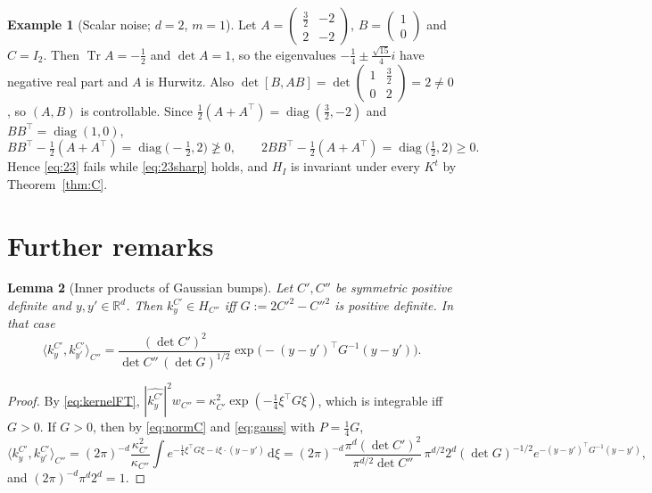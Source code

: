 \documentclass[11pt]{article}
\newtheorem{lemma}{Lemma}
\theoremstyle{definition}
\newtheorem{example}[lemma]{Example}
\theoremstyle{remark}
\newcommand{\R}{\mathbb{R}}
\newcommand{\Tr}{\operatorname{Tr}}
\newcommand{\dd}{\,\mathrm{d}}
\newcommand{\ip}[2]{\langle #1,#2\rangle}
\newcommand{\hatf}[1]{\widehat{#1}}
\newcommand{\tp}{\top}
\begin{document}
\begin{example}[Scalar noise; $d=2$, $m=1$]\label{ex:scalar}
Let $A=\begin{pmatrix}\frac32&-2\\2&-2\end{pmatrix}$, $B=\begin{pmatrix}1\\0\end{pmatrix}$ and $C=I_2$. Then $\Tr A=-\frac12$ and $\det A=1$, so
the eigenvalues $-\frac14\pm\frac{\sqrt{15}}4i$ have negative real part and $A$ is Hurwitz. Also
$\det[B,AB]=\det\begin{pmatrix}1&\frac32\\0&2\end{pmatrix}=2\neq0$, so $(A,B)$ is controllable. Since
$\frac12(A+A^\tp)=\operatorname{diag}(\frac32,-2)$ and $BB^\tp=\operatorname{diag}(1,0)$,
\[
BB^\tp-\tfrac12(A+A^\tp)=\operatorname{diag}\bigl(-\tfrac12,2\bigr)\not\ge0,\qquad
2BB^\tp-\tfrac12(A+A^\tp)=\operatorname{diag}\bigl(\tfrac12,2\bigr)\ge0 .
\]
Hence \eqref{eq:23} fails while \eqref{eq:23sharp} holds, and $H_I$ is invariant under every $K^t$ by Theorem~\ref{thm:C}.
\end{example}

\section{Further remarks}\label{sec:remarks}

\begin{lemma}[Inner products of Gaussian bumps]\label{lem:bumps}
Let $C',C''$ be symmetric positive definite and $y,y'\in\R^d$. Then $k^{C'}_y\in H_{C''}$ iff $G:=2C'^2-C''^2$ is
positive definite. In that case
\[
\ip{k^{C'}_y}{k^{C'}_{y'}}_{C''}=\frac{(\det C')^2}{\det C''\,(\det G)^{1/2}}\exp\bigl(-(y-y')^\tp G^{-1}(y-y')\bigr).
\]
\end{lemma}

\begin{proof}
By \eqref{eq:kernelFT}, $|\hatf{k^{C'}_y}|^2w_{C''}=\kappa_{C'}^2\exp(-\frac14\xi^\tp G\xi)$, which is integrable iff
$G>0$. If $G>0$, then by \eqref{eq:normC} and \eqref{eq:gauss} with $P=\frac14G$,
\[
\ip{k^{C'}_y}{k^{C'}_{y'}}_{C''}=(2\pi)^{-d}\frac{\kappa_{C'}^2}{\kappa_{C''}}\int e^{-\frac14\xi^\tp G\xi-i\xi\cdot(y-y')}\dd\xi
=(2\pi)^{-d}\frac{\pi^d(\det C')^2}{\pi^{d/2}\det C''}\,\pi^{d/2}2^d(\det G)^{-1/2}e^{-(y-y')^\tp G^{-1}(y-y')},
\]
and $(2\pi)^{-d}\pi^d2^d=1$.
\end{proof}
\end{document}
